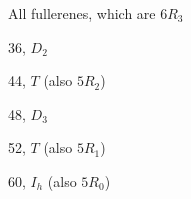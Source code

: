 \documentclass[%
pdf,
colorBG,
slideColor,
]{prosper}
\begin{document}
\begin{slide}{All fullerenes, which are $6R_3$}
\begin{center}
\begin{minipage}[b]{3.5cm}
\centering
{}\par
36, $D_2$
\end{minipage}
\begin{minipage}[b]{3.5cm}
\centering
{}\par
44, $T$ (also $5R_2$)
\end{minipage}
\begin{minipage}[b]{3.5cm}
\centering
{}\par
48, $D_3$
\end{minipage}
\begin{minipage}[b]{3.5cm}
\centering
{}\par
52, $T$ (also $5R_1$)
\end{minipage}
\begin{minipage}[b]{3.5cm}
\centering
{}\par
60, $I_h$ (also $5R_0$)
\end{minipage}
\end{center}
\end{slide}
\end{document}

